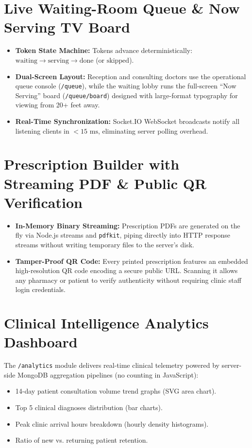 \documentclass[12pt,a4paper,oneside]{report}
\begin{document}
\section{Live Waiting-Room Queue \& Now Serving TV Board}
\begin{itemize}
    \item \textbf{Token State Machine:} Tokens advance deterministically: $\text{waiting} \rightarrow \text{serving} \rightarrow \text{done}$ (or $\text{skipped}$).
    \item \textbf{Dual-Screen Layout:} Reception and consulting doctors use the operational queue console (\texttt{/queue}), while the waiting lobby runs the full-screen ``Now Serving'' board (\texttt{/queue/board}) designed with large-format typography for viewing from 20+ feet away.
    \item \textbf{Real-Time Synchronization:} Socket.IO WebSocket broadcasts notify all listening clients in $<15\text{ ms}$, eliminating server polling overhead.
\end{itemize}

\section{Prescription Builder with Streaming PDF \& Public QR Verification}
\begin{itemize}
    \item \textbf{In-Memory Binary Streaming:} Prescription PDFs are generated on the fly via Node.js streams and \texttt{pdfkit}, piping directly into HTTP response streams without writing temporary files to the server's disk.
    \item \textbf{Tamper-Proof QR Code:} Every printed prescription features an embedded high-resolution QR code encoding a secure public URL. Scanning it allows any pharmacy or patient to verify authenticity without requiring clinic staff login credentials.
\end{itemize}

\section{Clinical Intelligence Analytics Dashboard}
The \texttt{/analytics} module delivers real-time clinical telemetry powered by server-side MongoDB aggregation pipelines (no counting in JavaScript):
\begin{itemize}
    \item 14-day patient consultation volume trend graphs (SVG area chart).
    \item Top 5 clinical diagnoses distribution (bar charts).
    \item Peak clinic arrival hours breakdown (hourly density histograms).
    \item Ratio of new vs. returning patient retention.
\end{itemize}
\end{document}
